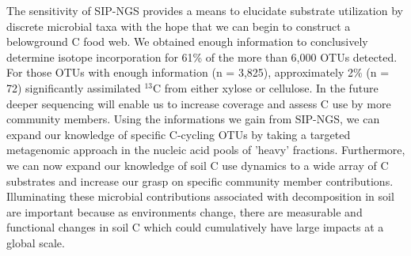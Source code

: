 The sensitivity of SIP-NGS provides a means to elucidate substrate utilization
by discrete microbial taxa with the hope that we can begin to construct a
belowground C food web. We obtained enough information to conclusively
determine isotope incorporation for 61\% of the more than 6,000 OTUs detected.
For those OTUs with enough information (n = 3,825), approximately 2\% (n = 72)
significantly assimilated $^{13}$C from either xylose or cellulose. In the
future deeper sequencing will enable us to increase coverage and assess C use
by more community members. Using the informations we gain from SIP-NGS, we can
expand our knowledge of specific C-cycling OTUs by taking a targeted
metagenomic approach in the nucleic acid pools of 'heavy' fractions.
Furthermore, we can now expand our knowledge of soil C use dynamics to a wide
array of C substrates and increase our grasp on specific community member
contributions. Illuminating these microbial contributions associated with
decomposition in soil are important because as environments change, there are
measurable and functional changes in soil C \citep{Grandy_2008} which could
cumulatively have large impacts at a global scale.
